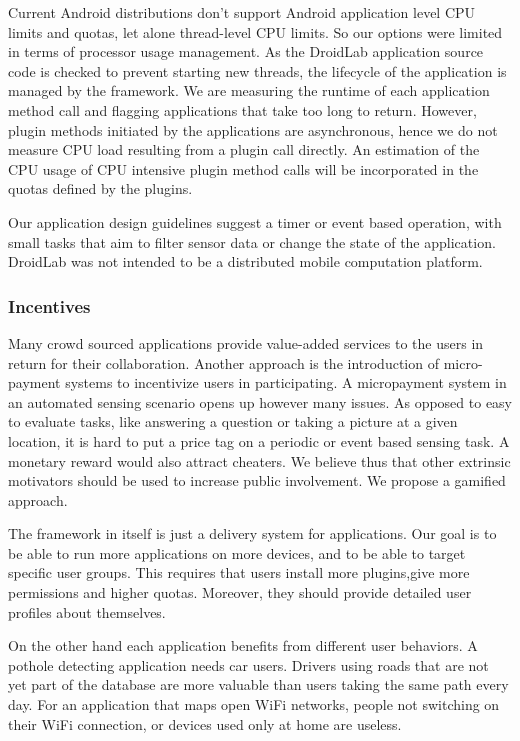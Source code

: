 \documentclass[conference,letterpaper]{IEEEtran}
\begin{document}
Current Android distributions don't support Android application level CPU limits and quotas, let alone thread-level CPU limits. So our options were limited in terms of processor usage management. As the DroidLab application source code is checked to prevent starting new threads, the lifecycle of the application is managed by the framework. We are measuring the runtime of each application method call and flagging applications that take too long to return. However, plugin methods initiated by the applications are asynchronous, hence we do not measure CPU load resulting from a plugin call directly. An estimation of the CPU usage of CPU intensive plugin method calls will be incorporated in the quotas defined by the plugins.

Our application design guidelines suggest a timer or event based operation, with small tasks that aim to filter sensor data or change the state of the application. DroidLab was not intended to be a distributed mobile computation platform.


\subsubsection{Incentives}

Many crowd sourced applications provide value-added services to the users in return for their collaboration. Another approach is the introduction of micro-payment systems to incentivize users in participating. A micropayment system in an automated sensing scenario opens up however many issues. As opposed to easy to evaluate tasks, like answering a question or taking a picture at a given location, it is hard to put a price tag on a periodic or event based sensing task. A monetary reward would also attract cheaters. We believe thus that other extrinsic motivators should be used to increase public involvement. We propose a gamified approach. 


The framework in itself is just a delivery system for applications. Our goal is to be able to run more applications on more devices, and to be able to target specific user groups. This requires that users install more plugins,give more permissions and higher quotas. Moreover, they should provide detailed user profiles about themselves.

On the other hand each application benefits from different user behaviors. A pothole detecting application needs car users. Drivers using roads that are not yet part of the database are more valuable than users taking the same path every day. For an application that maps open WiFi networks, people not switching on their WiFi connection, or devices used only at home are useless.
\end{document}
